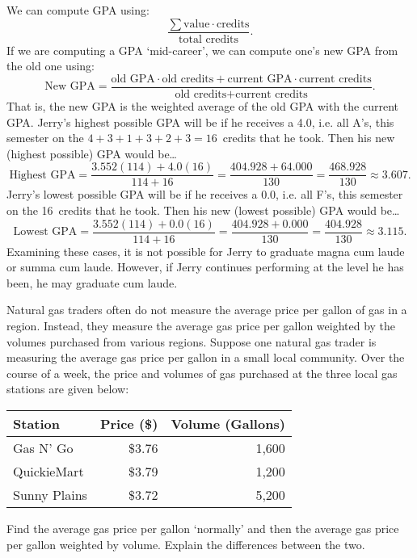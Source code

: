 \documentclass[11pt,letterpaper]{article}
\begin{document}
\sol We can compute GPA using: \pspace
	\[
	\dfrac{\sum \text{value} \cdot \text{credits}}{\text{total credits}}.
	\] \pspace
If we are computing a GPA `mid-career', we can compute one's new GPA from the old one using: \pspace
	\[ 
	\text{New GPA}= \dfrac{\text{old GPA} \cdot \text{old credits} + \text{current GPA} \cdot \text{current credits}}{\text{old credits} + \text{current credits}}.
	\] \pspace
That is, the new GPA is the weighted average of the old GPA with the current GPA. Jerry's highest possible GPA will be if he receives a 4.0, i.e. all A's, this semester on the $4 + 3 + 1 + 3 + 2 + 3= 16$~credits that he took. Then his new (highest possible) GPA would be\dots \pspace
	\[
	\text{Highest GPA}= \dfrac{3.552(114) + 4.0(16)}{114 + 16}= \dfrac{404.928 + 64.000}{130}= \dfrac{468.928}{130} \approx 3.607.
	\] \pspace
Jerry's lowest possible GPA will be if he receives a 0.0, i.e. all F's, this semester on the 16~credits that he took. Then his new (lowest possible) GPA would be\dots \pspace
	\[
	\text{Lowest GPA}= \dfrac{3.552(114) + 0.0(16)}{114 + 16}= \dfrac{404.928 + 0.000}{130}= \dfrac{404.928}{130} \approx 3.115.
	\] \pspace
Examining these cases, it is not possible for Jerry to graduate magna cum laude or summa cum laude. However, if Jerry continues performing at the level he has been, he may graduate cum laude. 





\newpage



 Natural gas traders often do not measure the average price per gallon of gas in a region. Instead, they measure the average gas price per gallon weighted by the volumes purchased from various regions. Suppose one natural gas trader is measuring the average gas price per gallon in a small local community. Over the course of a week, the price and volumes of gas purchased at the three local gas stations are given below: \par
	\begin{table}[!ht]
	\centering
        \begin{tabular}{lrr} \hline
	Station & Price (\$) & Volume (Gallons) \\ \hline
	Gas N' Go & \$3.76 & 1,600 \\
	QuickieMart & \$3.79 & 1,200 \\
	Sunny Plains & \$3.72 & 5,200
        \end{tabular}
	\end{table} \par
Find the average gas price per gallon `normally' and then the average gas price per gallon weighted by volume. Explain the differences between the two. \pspace
\end{document}
